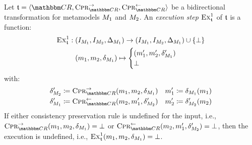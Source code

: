 \begin{definition}
    Let $\transformation{t} = \tupled{\consistencyrelationset{CR}, \consistencypreservationrule{\consistencyrelationset{CR}}^{\rightarrow}, \consistencypreservationrule{\consistencyrelationset{CR}}^{\leftarrow}}$ be a bidirectional transformation for metamodels $M_{1}$ and $M_{2}$.
    An \emph{execution step} $\textsc{Ex}_{\mathfrak{t}}^1$ of $\mathfrak{t}$ is a function:
    \begin{align*}
        \textsc{Ex}_{\mathfrak{t}}^1 : \; & (I_{M_{1}}, I_{M_{2}}, \Delta_{M_{1}}) \rightarrow (I_{M_{1}}, I_{M_{2}}, \Delta_{M_{1}}) \cup \{ \bot \} \\
        & (m_{1}, m_{2}, \delta_{M_{1}}) \mapsto 
        \begin{cases} 
            (m_{1}', m_{2}', \delta_{M_{1}}') \\
            \bot
        \end{cases}
    \end{align*}
    with:
    \begin{align*}
        & \change{\metamodel{M}{2}}' \equalsperdefinition \consistencypreservationrule{\consistencyrelationset{CR}}^{\rightarrow}(\model{m}{1}, \model{m}{2}, \change{\metamodel{M}{1}}) %
        & \model{m}{1}' \equalsperdefinition \change{\metamodel{M}{1}}(\model{m}{1}) \\
        & \change{\metamodel{M}{1}}' \equalsperdefinition \consistencypreservationrule{\consistencyrelationset{CR}}^{\leftarrow}(\model{m}{2}, \model{m}{1}', \change{\metamodel{M}{2}}') %
        & \model{m}{2}' \equalsperdefinition \change{\metamodel{M}{2}}'(\model{m}{2})
    \end{align*}
    If either consistency preservation rule is undefined for the input, i.e., $\consistencypreservationrule{\consistencyrelationset{CR}}^{\rightarrow}(\model{m}{1}, \model{m}{2}, \change{\metamodel{M}{1}}) = \bot$ or $\consistencypreservationrule{\consistencyrelationset{CR}}^{\leftarrow}(\model{m}{2}, \model{m}{1}', \change{\metamodel{M}{2}}') = \bot$, then the execution is undefined, i.e., $\textsc{Ex}_{\mathfrak{t}}^1(m_{1}, m_{2}, \delta_{M_{1}}) = \bot$.

\end{definition}
